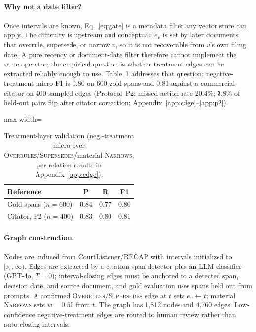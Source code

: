 \paragraph{Why not a date filter?}
Once intervals are known, Eq.~\eqref{eq:gate} is a metadata filter any vector store can apply.
The difficulty is upstream and conceptual: $e_v$ is set by later documents that overrule, supersede, or narrow $v$, so it is not recoverable from $v$'s own filing date.
A pure recency or document-date filter therefore cannot implement the same operator; the empirical question is whether treatment edges can be extracted reliably enough to use.
Table~\ref{tab:treatment} addresses that question: negative-treatment micro-F1 is 0.80 on 600 gold spans and 0.81 against a commercial citator on 400 sampled edges (Protocol~P2; missed-action rate 20.4\%; 3.8\% of held-out \plre{} pairs flip after citator correction; Appendix~\ref{app:edge}--\ref{app:p2}).

\begin{table}[t]
\centering
\small
\begin{adjustbox}{max width=\columnwidth}
\begin{tabular}{lccc}
\toprule
Reference & P & R & F1 \\
\midrule
Gold spans ($n = 600$) & 0.84 & 0.77 & 0.80 \\
Citator, P2 ($n = 400$) & 0.83 & 0.80 & 0.81 \\
\bottomrule
\end{tabular}
\end{adjustbox}
\caption{Treatment-layer validation (neg.-treatment micro over \textsc{Overrules}/\textsc{Supersedes}/material \textsc{Narrows}; per-relation results in Appendix~\ref{app:edge}).}
\label{tab:treatment}
\end{table}

\paragraph{Graph construction.}
Nodes are induced from CourtListener/RECAP with intervals initialized to $[s_v, \infty)$.
Edges are extracted by a citation-span detector plus an LLM classifier (GPT-4o, $T = 0$); interval-closing edges must be anchored to a detected span, decision date, and source document, and gold evaluation uses spans held out from prompts.
A confirmed \textsc{Overrules}/\textsc{Supersedes} edge at $t$ sets $e_v \leftarrow t$; material \textsc{Narrows} sets $w = 0.50$ from $t$.
The graph has 1{,}812 nodes and 4{,}760 edges.
Low-confidence negative-treatment edges are routed to human review rather than auto-closing intervals.

